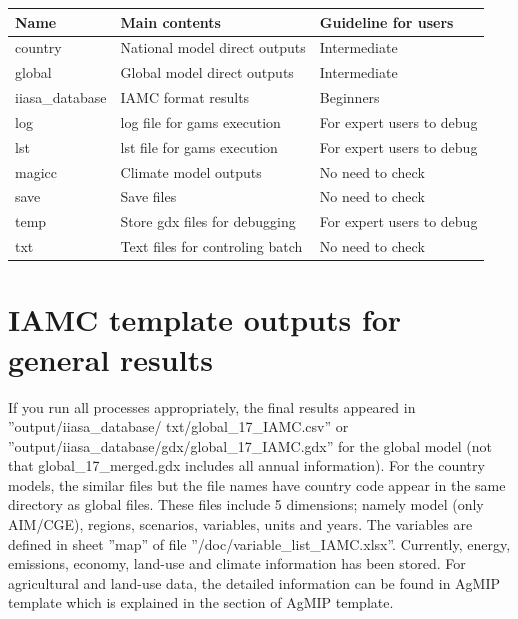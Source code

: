 \documentclass[10pt,a4paper,titlepage,dvipdfmx]{book}
\begin{document}
\begin{tabularx}{\textwidth}{|
p{}|
p{}|
p{}|} 
\caption{\label{tab:LisDirOut} list of directories in ''output''} \\
\hline 
Name & Main contents & Guideline for users \\\hline 
country & National model direct outputs & Intermediate \\\hline 
global & Global model direct outputs & Intermediate \\\hline 
iiasa\_database & IAMC format results & Beginners \\\hline 
log & log file for gams execution & For expert users to debug \\\hline 
lst & lst file for gams execution & For expert users to debug \\\hline 
magicc & Climate model outputs & No need to check \\\hline 
save & Save files & No need to check \\\hline 
temp & Store gdx files for debugging & For expert users to debug \\\hline 
txt & Text files for controling batch & No need to check \\\hline 
\end{tabularx}

\section{\label{sec:IAMCTemOut}IAMC template outputs for general results}

If you run all processes appropriately, the final results appeared in ''output/iiasa\_database/ txt/global\_17\_IAMC.csv'' or ''output/iiasa\_database/gdx/global\_17\_IAMC.gdx'' for the global model (not that global\_17\_merged.gdx includes all annual information). 
For the country models, the similar files but the file names have country code appear in the same directory as global files. These files include 5 dimensions; namely model (only AIM/CGE), regions, scenarios, variables, units and years. The variables are defined in sheet ''map'' of file ''/doc/variable\_list\_IAMC.xlsx''. Currently, energy, emissions, economy, land-use and climate information has been stored. For agricultural and land-use data, the detailed information can be found in AgMIP template which is explained in the section of AgMIP template.
\end{document}
